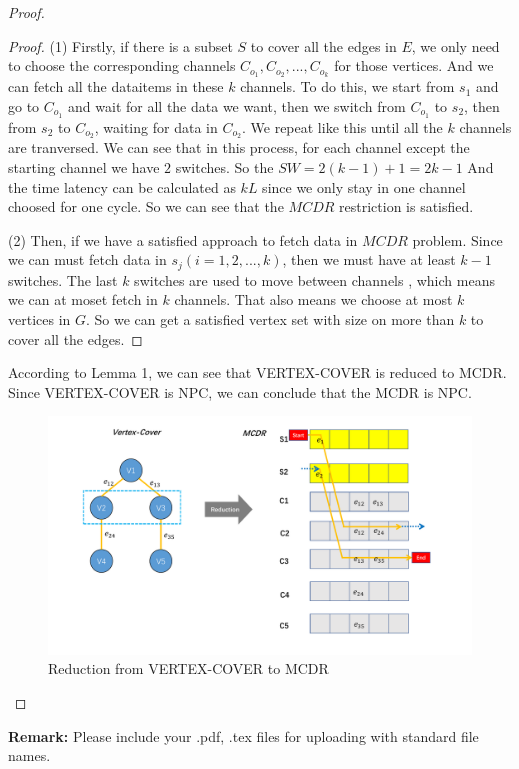 \documentclass[12pt,a4paper]{article}
\theoremstyle{definition}
\begin{document}
\begin{enumerate}
\begin{proof}
	\begin{proof}
		(1) Firstly, if there is a subset $S$ to cover all the edges in $E$, we only need to choose the corresponding channels $C_{o_1}, C_{o_2}, ..., C_{o_k}$ for those vertices. And we can fetch all the dataitems in these $k$ channels.
		To do this, we start from $s_1$ and go to $C_{o_1}$ and  wait for all the data we want, then we switch from $C_{o_1}$ to $s_2$, then from $s_2$ to $C_{o_2}$, waiting for data in $C_{o_2}$. We repeat like this until all the $k$ channels are tranversed.		
		We can see that in this process, for each channel except the starting channel we have $2$ switches. So the $SW = 2(k-1) + 1 = 2k- 1$ And the time latency can be calculated as $kL$ since we only stay in 
		one channel choosed for one cycle. So we can see that the $MCDR$ restriction is satisfied.

		(2) Then, if we have a satisfied approach to fetch data in $MCDR$ problem. Since we can must fetch data in $s_j(i=1, 2, ..., k)$, then we must have at least $k-1$ switches. The last $k$ switches are used to 
		move between channels , which means we can at moset fetch in $k$ channels. That also means we choose at most $k$ vertices in $G$. So we can get a satisfied vertex set with size on more than $k$ to cover all the edges.
	\end{proof}
	
	According to Lemma 1, we can see that VERTEX-COVER is reduced to MCDR. Since VERTEX-COVER is NPC, we can conclude that the MCDR is NPC.
	

	\begin{figure}

    \includegraphics[scale=0.6]{MCDR.pdf}
    \caption{Reduction from VERTEX-COVER to MCDR}

	\end{figure}
\end{proof}
\end{enumerate}

\textbf{Remark:} Please include your .pdf, .tex files for uploading with standard file names.




\end{document}
